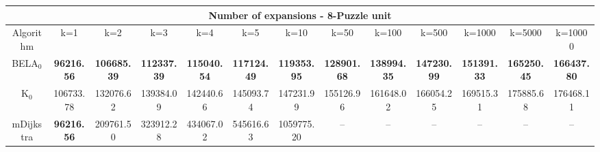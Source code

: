 \begin{tabular}{c|cccccccccccc}\toprule
\multicolumn{13}{c}{Number of expansions - 8-Puzzle unit}\\ \midrule
Algorithm & k=1 & k=2 & k=3 & k=4 & k=5 & k=10 & k=50 & k=100 & k=500 & k=1000 & k=5000 & k=10000 \\ \midrule
BELA$_0$ & \textbf{96216.56} & \textbf{106685.39} & \textbf{112337.39} & \textbf{115040.54} & \textbf{117124.49} & \textbf{119353.95} & \textbf{128901.68} & \textbf{138994.35} & \textbf{147230.99} & \textbf{151391.33} & \textbf{165250.45} & \textbf{166437.80} \\
K$_0$ & 106733.78 & 132076.62 & 139384.09 & 142440.66 & 145093.74 & 147231.99 & 155126.96 & 161648.02 & 166054.25 & 169515.31 & 175885.68 & 176468.11 \\
mDijkstra & \textbf{96216.56} & 209761.50 & 323912.28 & 434067.02 & 545616.63 & 1059775.20 & -- & -- & -- & -- & -- & -- \\ \bottomrule 
\end{tabular}
